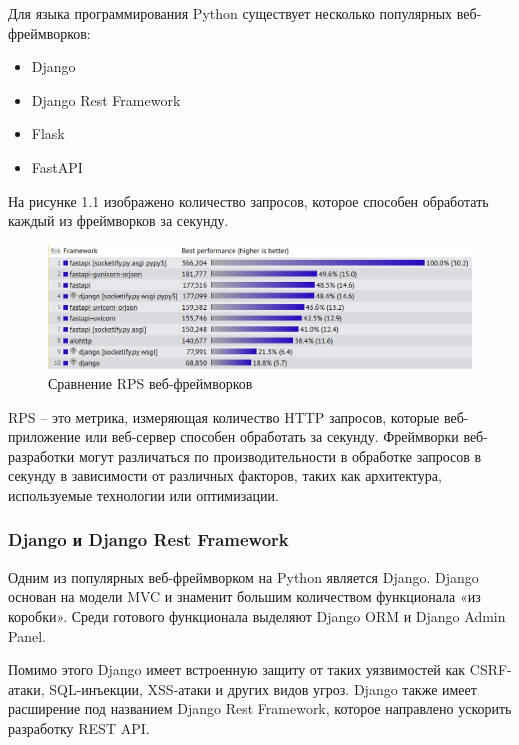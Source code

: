 Для языка программирования Python существует несколько популярных веб-фреймворков:
\begin{itemize}
    \item Django
    \item Django Rest Framework
    \item Flask
    \item FastAPI
\end{itemize}

На рисунке 1.1 изображено количество запросов, которое способен обработать каждый из фреймворков за секунду.

\begin{figure}[ht]
    \centering
    \includegraphics[width=.8\linewidth]{images/frameworks_rps}
    \caption{Сравнение RPS веб-фреймворков}
    \label{fig:domain:frameworks-rps}
\end{figure}

RPS -- это метрика, измеряющая количество HTTP запросов, которые веб-приложение или веб-сервер способен обработать за секунду.
Фреймворки веб-разработки могут различаться по производительности в обработке запросов в секунду в зависимости от различных факторов, таких как архитектура, используемые технологии или оптимизации.




\subsubsection{Django и Django Rest Framework}\label{subsubsec:domain:django--django-rest-framework}
Одним из популярных веб-фреймворком на Python является Django.
Django основан на модели MVC и знаменит большим количеством функционала «из коробки».
Среди готового функционала выделяют Django ORM и Django Admin Panel.

Помимо этого Django имеет встроенную защиту от таких уязвимостей как CSRF-атаки, SQL-инъекции, XSS-атаки и других видов угроз.
Django также имеет расширение под названием Django Rest Framework, которое направлено ускорить разработку REST API.

